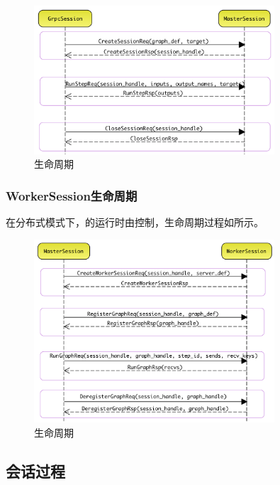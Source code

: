 \begin{content}
\begin{figure}[H]
\centering
\includegraphics[width=0.8\textwidth]{figures/dist-master-session-life-cycle.png}
\caption{生命周期}
 \label{fig:dist-master-session-life-cycle}
\end{figure}

\subsubsection{WorkerSession生命周期}

在分布式模式下，的运行时由控制，生命周期过程如所示。

\begin{figure}[H]
\centering
\includegraphics[width=0.8\textwidth]{figures/dist-worker-session-life-cycle.png}
\caption{生命周期}
 \label{fig:dist-worker-session-life-cycle}
\end{figure}

\subsection{会话过程}


\end{content}
